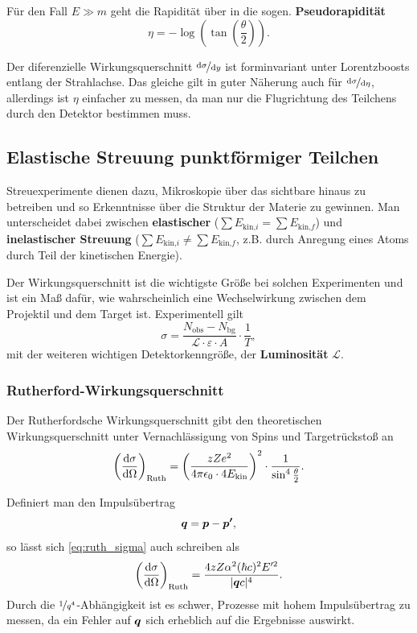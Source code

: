Für den Fall $E\gg m$ geht die Rapidität über in die sogen. \textbf{Pseudorapidität}
\begin{equation*}
	\eta = -\log\left(\tan\left(\frac{\theta}{2}\right)\right).
\end{equation*}

Der diferenzielle Wirkungsquerschnitt $\nicefrac{\text{d}\sigma}{\text{d}y}$ ist forminvariant unter Lorentzboosts entlang der Strahlachse.
Das gleiche gilt in guter Näherung auch für $\nicefrac{\text{d}\sigma}{\text{d}\eta}$, allerdings ist $\eta$ einfacher zu messen, da man nur die Flugrichtung des Teilchens durch den Detektor bestimmen muss.

\subsection{Elastische Streuung punktförmiger Teilchen}
Streuexperimente dienen dazu, Mikroskopie über das sichtbare hinaus zu betreiben und so Erkenntnisse über die Struktur der Materie zu gewinnen.
Man unterscheidet dabei zwischen \textbf{elastischer} ($\sum E_{\text{kin,}i} = \sum E_{\text{kin,}f}$) und \textbf{inelastischer Streuung} ($\sum E_{\text{kin,}i} \neq \sum E_{\text{kin,}f}$, z.B. durch Anregung eines Atoms durch Teil der kinetischen Energie).

Der Wirkungsquerschnitt ist die wichtigste Größe bei solchen Experimenten und ist ein Maß dafür, wie wahrscheinlich eine Wechselwirkung zwischen dem Projektil und dem Target ist.
Experimentell gilt
\begin{equation*}
	\sigma = \frac{N_\text{obs}-N_\text{bg}}{\mathcal{L}\cdot\varepsilon\cdot A}\cdot\frac{1}{T},
\end{equation*}
mit der weiteren wichtigen Detektorkenngröße, der \textbf{Luminosität} $\mathcal{L}$.

\subsubsection{Rutherford-Wirkungsquerschnitt}
Der Rutherfordsche Wirkungsquerschnitt gibt den theoretischen Wirkungsquerschnitt unter Vernachlässigung von Spins und Targetrückstoß an
\begin{equation}\label{eq:ruth_sigma}
	\left(\diff[\sigma]{\Omega}\right)_\text{Ruth} = \left(\frac{zZe^2}{4\pi\epsilon_0\cdot 4E_\text{kin}}\right)^2\cdot\frac{1}{\sin^4\frac{\theta}{2}}.
\end{equation}

Definiert man den Impulsübertrag
\begin{equation*}
	\mvec{q} = \mvec{p}-\mvec{p'},
\end{equation*}
so lässt sich \autoref{eq:ruth_sigma} auch schreiben als
\begin{equation*}
	\left(\diff[\sigma]{\Omega}\right)_\text{Ruth} = \frac{4zZ\alpha^2(\hbar c)^2 E'^2}{|\mvec{q}c|^4}.
\end{equation*}
Durch die $\nicefrac{1}{q^4}$-Abhängigkeit ist es schwer, Prozesse mit hohem Impulsübertrag zu messen, da ein Fehler auf $\mvec{q}$ sich erheblich auf die Ergebnisse auswirkt.

